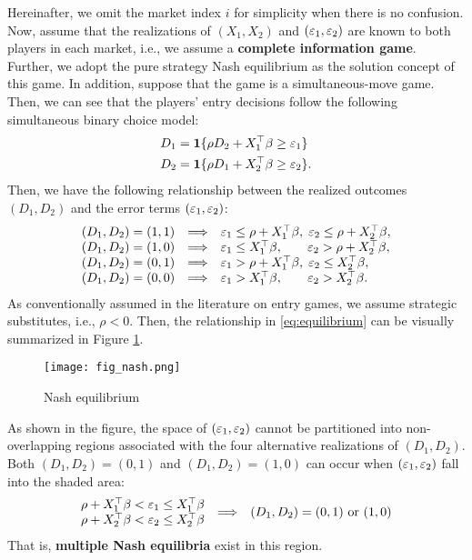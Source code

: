 \documentclass[11pt, A4paper, openany, uplatex]{book}
\begin{document}
Hereinafter, we omit the market index $i$ for simplicity when there is no confusion.
Now, assume that the realizations of $(X_1, X_2)$ and $(\varepsilon_1, \varepsilon_2)$ are known to both players in each market, i.e., we assume a \textbf{complete information game}.
Further, we adopt the pure strategy Nash equilibrium as the solution concept of this game.
In addition, suppose that the game is a simultaneous-move game.
Then, we can see that the players' entry decisions follow the following simultaneous binary choice model:
\begin{align}\label{eq:entry}
\begin{split}
D_1 & = \mathbf{1}\{\rho D_2 + X_1^\top \beta \geq \varepsilon_1 \} \\
D_2 & = \mathbf{1}\{\rho D_1 + X_2^\top \beta \geq \varepsilon_2 \}.
\end{split}
\end{align}
Then, we have the following relationship between the realized outcomes $(D_1, D_2)$ and the error terms $(\varepsilon_1, \varepsilon_2)$:
\begin{equation} \label{eq:equilibrium}
\begin{array}{lcl}
(D_1, D_2) = (1, 1) & \Longrightarrow & \varepsilon_1 \le \rho + X_1^\top \beta, \; \varepsilon_2 \le \rho + X_2^\top\beta, \\
(D_1, D_2) = (1, 0) & \Longrightarrow & \varepsilon_1 \le X_1^\top \beta, \;\;\;\;\;\;\;  \varepsilon_2 > \rho + X_2^\top\beta, \\
(D_1, D_2) = (0, 1) & \Longrightarrow & \varepsilon_1 > \rho + X_1^\top \beta, \; \varepsilon_2 \le X_2^\top\beta, \\
(D_1, D_2) = (0, 0) & \Longrightarrow & \varepsilon_1 > X_1^\top \beta, \;\;\;\;\;\;\; \varepsilon_2 > X_2^\top\beta.
\end{array}
\end{equation}
As conventionally assumed in the literature on entry games, we assume strategic substitutes, i.e., $\rho < 0$.
Then, the relationship in \eqref{eq:equilibrium} can be visually summarized in Figure \ref{fig:nash}.
\begin{figure}[h!]
	\begin{center}
		\texttt{[image: fig\_nash.png]}
		\caption{Nash equilibrium}
		\label{fig:nash}
	\end{center}
\end{figure}
As shown in the figure, the space of $(\varepsilon_1, \varepsilon_2)$ cannot be partitioned into non-overlapping regions associated with the four alternative realizations of $(D_1, D_2)$.
Both $(D_1,D_2) = (0, 1)$ and $(D_1, D_2) = (1, 0)$ can occur when $(\varepsilon_1, \varepsilon_2)$ fall into the shaded area:
\[
	\begin{array}{l}
		\rho + X_1^\top\beta < \varepsilon_1 \le X_1^\top\beta \\
		\rho + X_2^\top\beta < \varepsilon_2 \le X_2^\top\beta
	\end{array} 
	\begin{array}{ll}
		\Longrightarrow & \text{$(D_1, D_2) = (0,1)$ or $(1,0)$}
	\end{array}
\]
That is, \textbf{multiple Nash equilibria} exist in this region.
\end{document}

